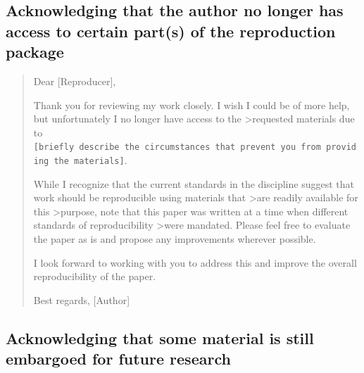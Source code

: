 \documentclass[
]{book}
\begin{document}
\hypertarget{acknowledging-that-the-author-no-longer-has-access-to-certain-parts-of-the-reproduction-package}{%
\subsection{Acknowledging that the author no longer has access to certain part(s) of the reproduction package}\label{acknowledging-that-the-author-no-longer-has-access-to-certain-parts-of-the-reproduction-package}}

\begin{quote}
Dear {[}Reproducer{]},

Thank you for reviewing my work closely. I wish I could be of more help, but unfortunately I no longer have access to the \textgreater requested materials due to \texttt{{[}briefly\ describe\ the\ circumstances\ that\ prevent\ you\ from\ providing\ the\ materials{]}}.

While I recognize that the current standards in the discipline suggest that work should be reproducible using materials that \textgreater are readily available for this \textgreater purpose, note that this paper was written at a time when different standards of reproducibility \textgreater were mandated. Please feel free to evaluate the paper as is and propose any improvements wherever possible.

I look forward to working with you to address this and improve the overall reproducibility of the paper.

Best regards,
{[}Author{]}
\end{quote}

\hypertarget{acknowledging-that-some-material-is-still-embargoed-for-future-research}{%
\subsection{Acknowledging that some material is still embargoed for future research}\label{acknowledging-that-some-material-is-still-embargoed-for-future-research}}
\end{document}

